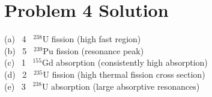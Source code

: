 \documentclass{report}
\begin{document}
\newpage


\section*{Problem 4 Solution}


\tab\tab (a) \, 4 \, $^{238}$U fission (high fast region) 					\\
\tab\tab (b) \, 5 \, $^{239}$Pu fission (resonance peak)					\\
\tab\tab (c) \, 1 \, $^{155}$Gd absorption (consistently high absorption)	\\
\tab\tab (d) \, 2 \, $^{235}$U fission (high thermal fission cross section)	\\
\tab\tab (e) \, 3 \, $^{238}$U absorption (large absorptive resonances)
\end{document}

